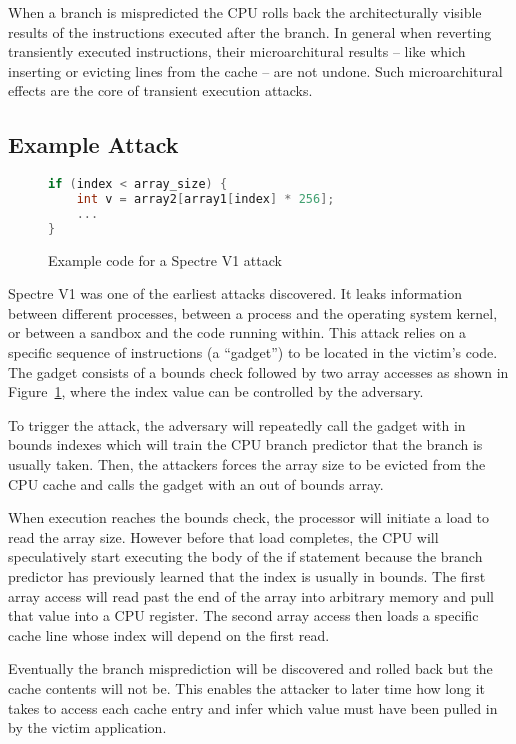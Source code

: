 When a branch is mispredicted the CPU rolls back the architecturally visible results of the instructions executed after the branch.
In general when reverting transiently executed instructions, their microarchitural results -- like which inserting or evicting lines from the cache -- are not undone.
Such microarchitural effects are the core of transient execution attacks.

\subsection*{Example Attack}
\begin{figure}[h]
\begin{lstlisting}[language=C, style=codeStyle]
if (index < array_size) {
    int v = array2[array1[index] * 256];
    ...
}
\end{lstlisting}
\caption{Example code for a Spectre V1 attack}
\label{fig:spectre-code}
\end{figure}
Spectre V1 was one of the earliest attacks discovered.
It leaks information between different processes, between a process and the operating system kernel, or between a sandbox and the code running within.
This attack relies on a specific sequence of instructions (a ``gadget'') to be located in the victim's code.
The gadget consists of a bounds check followed by two array accesses as shown in Figure~\ref{fig:spectre-code}, where the index value can be controlled by the adversary.

To trigger the attack, the adversary will repeatedly call the gadget with in bounds indexes which will train the CPU branch predictor that the branch is usually taken.
Then, the attackers forces the array size to be evicted from the CPU cache and calls the gadget with an out of bounds array.

When execution reaches the bounds check, the processor will initiate a load to read the array size.
However before that load completes, the CPU will speculatively start executing the body of the if statement because the branch predictor has previously learned that the index is usually in bounds.
The first array access will read past the end of the array into arbitrary memory and pull that value into a CPU register.
The second array access then loads a specific cache line whose index will depend on the first read.

Eventually the branch misprediction will be discovered and rolled back but the cache contents will not be.
This enables the attacker to later time how long it takes to access each cache entry and infer which value must have been pulled in by the victim application.

